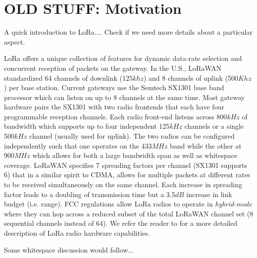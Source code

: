 \section{OLD STUFF: Motivation}
\label{sec:old-net-scale}

{\color{blue} A quick introduction to LoRa.... Check if we need more details about a particular aspect.}

LoRa offers a unique collection of features for dynamic data-rate selection and concurrent reception of packets on the gateway. In the U.S., LoRaWAN standardized 64 channels of downlink (125$khz$) and 8 channels of uplink (500$Khz$) per base station. Current gateways use the Semtech SX1301 base band processor which can listen on up to 8 channels at the same time. Most gateway hardware pairs the SX1301 with two radio frontends that each have four programmable reception channels. Each radio front-end listens across 800$kHz$ of bandwidth which supports up to four independent 125$kHz$ channels or a single 500$kHz$ channel (usually used for uplink).  The two radios can be configured independently such that one operates on the 433$MHz$ band while the other at 900$MHz$ which allows for both a large bandwidth span as well as whitespace coverage.  LoRaWAN specifies 7 spreading factors per channel (SX1301 supports 6) that in a similar spirit to CDMA, allows for multiple packets at different rates to be received simultaneously on the same channel.  Each increase in spreading factor leads to a doubling of transmission time but a 3.5$dB$ increase in link budget (i.e. range).  FCC regulations allow LoRa radios to operate in {\em hybrid-mode} where they can hop across a reduced subset of the total LoRaWAN channel set (8 sequential channels instead of 64). We refer the reader to \cite{sx1301} for a more detailed description of LoRa radio hardware capabilities.

{\color{blue} Some whitespace discussion would follow...}


